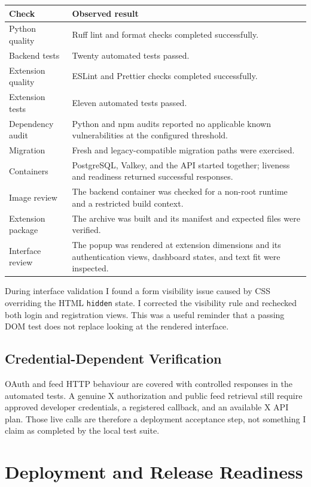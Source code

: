 \documentclass[11pt,a4paper]{report}
\newcommand{\code}[1]{\texttt{#1}}
\begin{document}
\begin{longtable}{L{0.28\textwidth} L{0.62\textwidth}}
\toprule
\textbf{Check} & \textbf{Observed result} \\
\midrule
\endhead
Python quality & Ruff lint and format checks completed successfully. \\
Backend tests & Twenty automated tests passed. \\
Extension quality & ESLint and Prettier checks completed successfully. \\
Extension tests & Eleven automated tests passed. \\
Dependency audit & Python and npm audits reported no applicable known
vulnerabilities at the configured threshold. \\
Migration & Fresh and legacy-compatible migration paths were exercised. \\
Containers & PostgreSQL, Valkey, and the API started together; liveness and
readiness returned successful responses. \\
Image review & The backend container was checked for a non-root runtime and a
restricted build context. \\
Extension package & The archive was built and its manifest and expected files
were verified. \\
Interface review & The popup was rendered at extension dimensions and its
authentication views, dashboard states, and text fit were inspected. \\
\bottomrule
\end{longtable}

During interface validation I found a form visibility issue caused by CSS
overriding the HTML \code{hidden} state. I corrected the visibility rule and
rechecked both login and registration views. This was a useful reminder that a
passing DOM test does not replace looking at the rendered interface.

\section{Credential-Dependent Verification}
OAuth and feed HTTP behaviour are covered with controlled responses in the
automated tests. A genuine X authorization and public feed retrieval still
require approved developer credentials, a registered callback, and an
available X API plan. Those live calls are therefore a deployment acceptance
step, not something I claim as completed by the local test suite.

\chapter{Deployment and Release Readiness}
\end{document}
